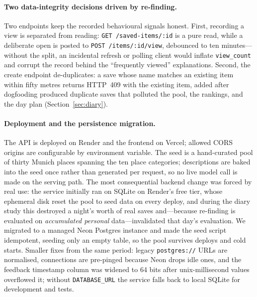 \documentclass[acmlarge]{acmart}
\begin{document}
\paragraph{Two data-integrity decisions driven by re-finding.}
Two endpoints keep the recorded behavioural signals honest. First,
recording a view is separated from reading:
\texttt{GET /saved-items/:id} is a pure read, while a deliberate open is
posted to \texttt{POST /items/:id/view}, debounced to ten
minutes---without the split, an incidental refresh or polling client
would inflate \texttt{view\_count} and corrupt the record behind the
``frequently viewed'' explanations. Second, the create endpoint
de-duplicates: a save whose name matches an existing item within fifty
metres returns HTTP~409 with the existing item, added after dogfooding
produced duplicate saves that polluted the pool, the rankings, and the
day plan (Section~\ref{sec:diary}).

\paragraph{Deployment and the persistence migration.}
The API is deployed on Render and the frontend on Vercel; allowed CORS
origins are configurable by environment variable. The seed is a
hand-curated pool of thirty Munich places spanning the ten place
categories; descriptions are baked into the seed once rather than
generated per request, so no live model call is made on the serving path.
The most consequential backend change was forced by real use: the service
initially ran on SQLite on Render's free tier, whose ephemeral disk reset
the pool to seed data on every deploy, and during the diary study this
destroyed a night's worth of real saves and---because re-finding is
evaluated on \emph{accumulated personal} data---invalidated that day's
evaluation. We migrated to a managed Neon Postgres instance and made the
seed script idempotent, seeding only an empty table, so the pool survives
deploys and cold starts. Smaller fixes from the same period: legacy
\texttt{postgres://} URLs are normalised, connections are pre-pinged
because Neon drops idle ones, and the feedback timestamp column was
widened to 64 bits after unix-millisecond values overflowed it; without
\texttt{DATABASE\_URL} the service falls back to local SQLite for
development and tests.

\end{document}
